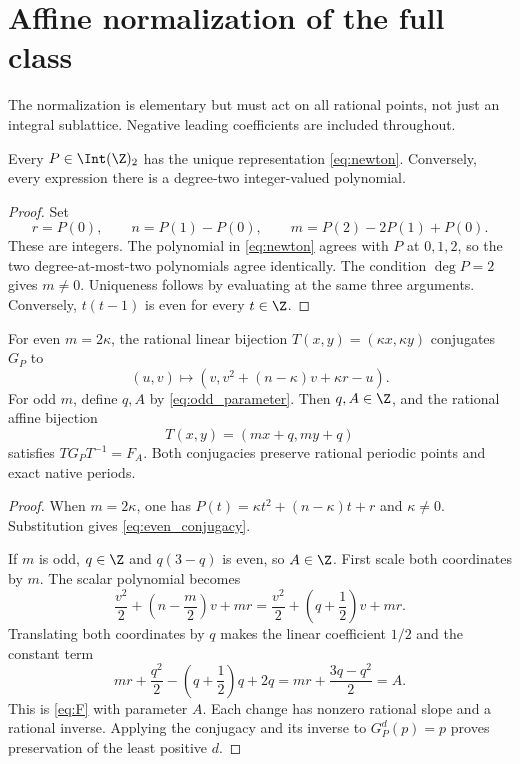 \section{Affine normalization of the full class}
\label{sec:normalization}

The normalization is elementary but must act on all rational points,
not just an integral sublattice. Negative leading coefficients are
included throughout.

\begin{lemma}
\label{lem:newton}
Every $P\in\Int(\Z)_2$ has the unique representation
\eqref{eq:newton}. Conversely, every expression there is a degree-two
integer-valued polynomial.
\end{lemma}
\begin{proof}
Set
\[
 r=P(0),\qquad n=P(1)-P(0),\qquad
 m=P(2)-2P(1)+P(0).
\]
These are integers. The polynomial in \eqref{eq:newton} agrees with
$P$ at $0,1,2$, so the two degree-at-most-two polynomials agree
identically. The condition $\deg P=2$ gives $m\ne0$.
Uniqueness follows by evaluating at the same three arguments.
Conversely, $t(t-1)$ is even for every $t\in\Z$.
\end{proof}

\begin{proposition}
\label{prop:normalization}
For even $m=2\kappa$, the rational linear bijection
$T(x,y)=(\kappa x,\kappa y)$ conjugates $G_P$ to
\begin{equation}
 (u,v)\longmapsto
 (v,v^2+(n-\kappa)v+\kappa r-u).
 \label{eq:even_conjugacy}
\end{equation}
For odd $m$, define $q,A$ by \eqref{eq:odd_parameter}.
Then $q,A\in\Z$, and the rational affine bijection
\begin{equation}
 T(x,y)=(mx+q,my+q)
 \label{eq:odd_conjugacy}
\end{equation}
satisfies $TG_PT^{-1}=F_A$.
Both conjugacies preserve rational periodic points and exact native periods.
\end{proposition}
\begin{proof}
When $m=2\kappa$, one has
$P(t)=\kappa t^2+(n-\kappa)t+r$ and $\kappa\ne0$.
Substitution gives \eqref{eq:even_conjugacy}.

If $m$ is odd, $q\in\Z$ and $q(3-q)$ is even, so $A\in\Z$.
First scale both coordinates by $m$. The scalar polynomial becomes
\[
 \frac{v^2}{2}+\left(n-\frac m2\right)v+mr
 =\frac{v^2}{2}+\left(q+\frac12\right)v+mr.
\]
Translating both coordinates by $q$ makes the linear coefficient $1/2$
and the constant term
\[
 mr+\frac{q^2}{2}-\left(q+\frac12\right)q+2q
 =mr+\frac{3q-q^2}{2}=A.
\]
This is \eqref{eq:F} with parameter $A$. Each change has nonzero
rational slope and a rational inverse. Applying the conjugacy and its
inverse to $G_P^d(p)=p$ proves preservation of the least positive $d$.
\end{proof}

